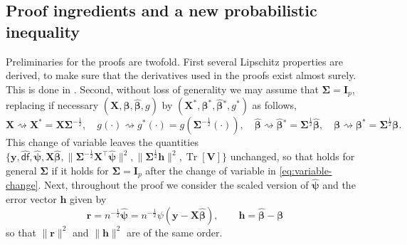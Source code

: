 \documentclass[11pt]{amsart}
\numberwithin{equation}{section}
\numberwithin{equation}{section}
\DeclareMathOperator{\trace}{Tr}
\def\mathbold{\boldsymbol} %
\def\bh{\mathbold{h}}\def\hhat{\widehat{h}}\def\htil{\widetilde{h}}
\def\bI{\mathbold{I}}\def\hbI{{\widehat{\bI}}}\def\tbI{{\widetilde{\bI}}}
\def\br{\mathbold{r}}\def\rhat{\widehat{r}}\def\rtil{\widetilde{r}}\def\rbar{{\overline r}}\def\brbar{{\overline \br}}
\def\bV{\mathbold{V}}\def\hbV{{\widehat{\bV}}}\def\tbV{{\widetilde{\bV}}}
\def\bX{\mathbold{X}}\def\hbX{{\widehat{\bX}}}\def\tbX{{\widetilde{\bX}}}\def\bXbar{{\overline \bX}}
\def\by{\mathbold{y}}\def\yhat{\widehat{y}}\def\ytil{\widetilde{y}}\def\ybar{{\overline y}}\def\vby{{\bf y}}
\def\bbeta{\mathbold{\beta}}\def\betahat{\widehat{\beta}}\def\hbeta{\widehat{\beta}}
\def\hbbeta{{{\widehat{\bbeta}}}}
\def\bSigma{\mathbold{\Sigma}}\def\hbSigma{{\widehat{\bSigma}}}
\def\bpsi{\mathbold{\psi}}\def\psihat{\widehat{\psi}}\def\hpsi{\widehat{\psi}}
\def\hbpsi{{\widehat{\bpsi}}}\def\tbpsi{{\widetilde{\bpsi}}}
\def\df{{\hat{\mathsf{df}}}{}}
\begin{document}
\subsection{Proof ingredients and a new probabilistic inequality}
\label{sec:proof-sketch}
Preliminaries for the proofs are twofold.
First several Lipschitz
properties are derived, to make sure that the derivatives used in the proofs
exist almost surely.
This is done in .
Second, without loss of generality we may assume that $\bSigma=\bI_p$, replacing
if necessary $(\bX,\bbeta,\hbbeta,g)$ by $(\bX^*,\bbeta^*,\hbbeta{}^*,g^*)$ as follows,
\begin{equation}
    \label{eq:variable-change}
    \bX\rightsquigarrow \bX^* =  \bX\bSigma^{-\frac12},
    \quad
    g(\cdot) \rightsquigarrow g^*(\cdot) = g(\bSigma^{-\frac12}(\cdot)),
    \quad
    \hbbeta \rightsquigarrow \hbbeta{}^* = 
    \bSigma^{\frac12}\hbbeta,
    \quad
    \bbeta \rightsquigarrow \bbeta^* = 
    \bSigma^{\frac12}\bbeta
    .
\end{equation}
This change of variable leaves the quantities $\{\by, \df, \hbpsi, \bX\hbbeta,
\|\bSigma^{-\frac12}\bX^\top\hbpsi\|^2,\|\bSigma^{\frac12}\bh\|^2,\trace[\bV]\}$ unchanged,
so that  holds for general $\bSigma$
if it holds for $\bSigma=\bI_p$ after the change of variable in
\eqref{eq:variable-change}.
Next, throughout the proof we 
consider the scaled version of $\hbpsi$ and the error vector $\bh$ given by
\begin{equation}
    \label{eq:br-bh-proof-overview}
\br = n^{-\frac12} \hbpsi = n^{-\frac12} \psi(\by-\bX\hbbeta),
\qquad
\bh = \hbbeta-\bbeta 
\end{equation}
so that $\|\br\|^2$ and $\|\bh\|^2$ are of the same order.
\end{document}

